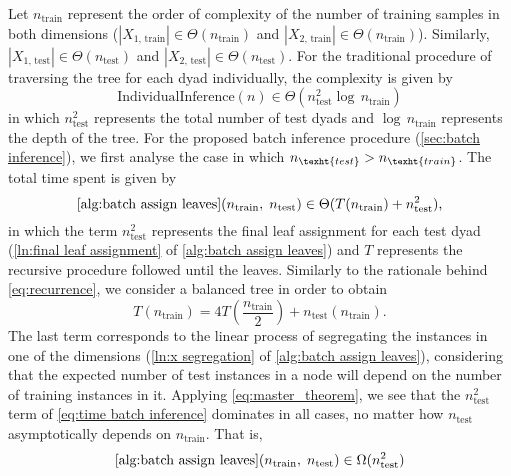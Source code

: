 \documentclass[sn-mathphys-num]{sn-jnl}%
\theoremstyle{thmstyleone}%
\theoremstyle{thmstyletwo}%
\theoremstyle{thmstylethree}%
\begin{document}
\begin{appendices}
Let $n_\text{train}$ represent the order of complexity of the number of training samples in both dimensions ($|X_\text{1, train}| \in \Theta(n_\text{train})$ and $|X_\text{2, train}| \in \Theta(n_\text{train})$). Similarly, $|X_\text{1, test}| \in \Theta(n_\text{test})$ and $|X_\text{2, test}| \in \Theta(n_\text{test})$.
For the traditional procedure of traversing the tree for each dyad individually, the complexity is given by
\begin{equation}
    \text{IndividualInference}(n) \in \Theta(n_\text{test}^2\log\, n_\text{train})
\end{equation}
in which $n_\text{test}^2$ represents the total number of test dyads and $\log\, n_\text{train}$ represents the depth of the tree.
For the proposed batch inference procedure (\autoref{sec:batch inference}), we first analyse the case in which $n_\texht{test} > n_\texht{train}$. The total time spent is given by
\begin{equation}
    \label{eq:time batch inference}
    \text{\ref{alg:batch assign leaves}}(n_\text{train},\; n_\text{test})
    \in \Theta( T(n_\text{train}) + n_\text{test}^2)
    \text{,}
\end{equation}
%
in which the term $n_\text{test}^2$ represents the final leaf assignment for each test dyad (\autoref{ln:final leaf assignment} of \autoref{alg:batch assign leaves}) and $T$ represents the recursive procedure followed until the leaves. Similarly to the rationale behind \autoref{eq:recurrence}, we consider a balanced tree in order to obtain
%
\begin{equation}
    T(n_\text{train}) = 4T\left(\frac{n_\text{train}}{2}\right) + n_\text{test}(n_\text{train})
    \text{.}
    \label{eq:recurrence predict}
\end{equation}
%
The last term corresponds to the linear process of segregating the instances in one of the dimensions (\autoref{ln:x segregation} of \autoref{alg:batch assign leaves}), considering that the expected number of test instances in a node will depend on the number of training instances in it.
Applying \autoref{eq:master_theorem}, we see that the $n_\text{test}^2$ term of \autoref{eq:time batch inference} dominates in all cases, no matter how $n_\text{test}$ asymptotically depends on $n_\text{train}$. That is,
\begin{equation}
    \label{eq:complexity batch inference n test greater}
    \text{\ref{alg:batch assign leaves}}(n_\text{train},\; n_\text{test})
    \in \Omega(n_\text{test}^2)
\end{equation}

\end{appendices}
\end{document}
